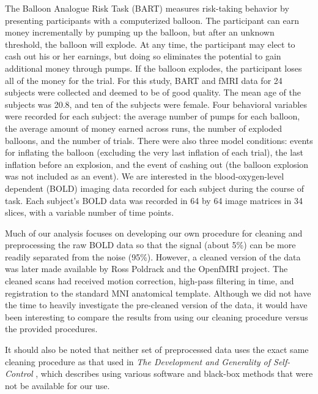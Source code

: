 \par \indent The Balloon Analogue Risk Task (BART) measures risk-taking 
behavior by presenting participants with a computerized balloon. The 
participant can earn money incrementally by pumping up the balloon, but after 
an unknown threshold, the balloon will explode. At any time, the participant 
may elect to cash out his or her earnings, but doing so eliminates the 
potential to gain additional money through pumps. If the balloon explodes, the 
participant loses all of the money for the trial. For this study, BART and 
fMRI data for 24 subjects were collected and deemed to be of good quality. 
The mean age of the subjects was 20.8, and ten of the subjects were female. 
Four behavioral variables were recorded for each subject: the average number 
of pumps for each balloon, the average amount of money earned across runs, the 
number of exploded balloons, and the number of trials. There were also three 
model conditions: events for inflating the balloon (excluding the very last 
inflation of each trial), the last inflation before an explosion, and the 
event of cashing out (the balloon explosion was not included as an event). We 
are interested in the blood-oxygen-level dependent (BOLD) imaging data 
recorded for each subject during the course of task. Each subject's BOLD data 
was recorded in 64 by 64 image matrices in 34 slices, with a variable number 
of time points. 

\par Much of our analysis focuses on developing our own procedure for cleaning 
and preprocessing the raw BOLD data so that the signal (about 5\%) can be more 
readily separated from the noise (95\%). However, a cleaned version of the 
data was later made available by Ross Poldrack and the OpenfMRI project. The 
cleaned scans had received motion correction, high-pass filtering in time, 
and registration to the standard MNI anatomical template. Although we did not 
have the time to heavily investigate the pre-cleaned version of the data, it 
would have been interesting to compare the results from using our cleaning 
procedure versus the provided procedures.

\par It should also be noted that neither set of preprocessed data uses the 
exact same cleaning procedure as that used in \textit{The Development and 
Generality of Self-Control} \cite{CohenSelfControl}, which describes using 
various software and black-box methods that were not be available for our use. 
